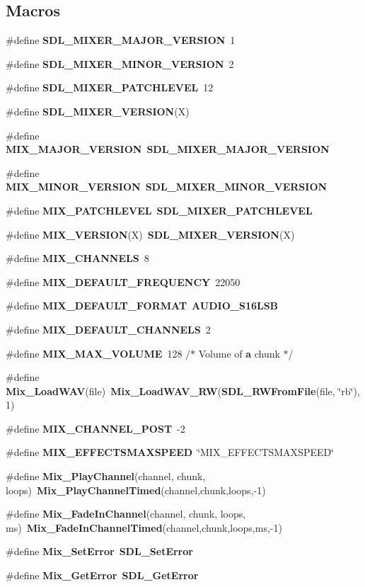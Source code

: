 \subsection*{Macros}
\begin{DoxyCompactItemize}
\item 
\#define {\bf S\+D\+L\+\_\+\+M\+I\+X\+E\+R\+\_\+\+M\+A\+J\+O\+R\+\_\+\+V\+E\+R\+S\+I\+O\+N}~1
\item 
\#define {\bf S\+D\+L\+\_\+\+M\+I\+X\+E\+R\+\_\+\+M\+I\+N\+O\+R\+\_\+\+V\+E\+R\+S\+I\+O\+N}~2
\item 
\#define {\bf S\+D\+L\+\_\+\+M\+I\+X\+E\+R\+\_\+\+P\+A\+T\+C\+H\+L\+E\+V\+E\+L}~12
\item 
\#define {\bf S\+D\+L\+\_\+\+M\+I\+X\+E\+R\+\_\+\+V\+E\+R\+S\+I\+O\+N}(X)
\item 
\#define {\bf M\+I\+X\+\_\+\+M\+A\+J\+O\+R\+\_\+\+V\+E\+R\+S\+I\+O\+N}~{\bf S\+D\+L\+\_\+\+M\+I\+X\+E\+R\+\_\+\+M\+A\+J\+O\+R\+\_\+\+V\+E\+R\+S\+I\+O\+N}
\item 
\#define {\bf M\+I\+X\+\_\+\+M\+I\+N\+O\+R\+\_\+\+V\+E\+R\+S\+I\+O\+N}~{\bf S\+D\+L\+\_\+\+M\+I\+X\+E\+R\+\_\+\+M\+I\+N\+O\+R\+\_\+\+V\+E\+R\+S\+I\+O\+N}
\item 
\#define {\bf M\+I\+X\+\_\+\+P\+A\+T\+C\+H\+L\+E\+V\+E\+L}~{\bf S\+D\+L\+\_\+\+M\+I\+X\+E\+R\+\_\+\+P\+A\+T\+C\+H\+L\+E\+V\+E\+L}
\item 
\#define {\bf M\+I\+X\+\_\+\+V\+E\+R\+S\+I\+O\+N}(X)~{\bf S\+D\+L\+\_\+\+M\+I\+X\+E\+R\+\_\+\+V\+E\+R\+S\+I\+O\+N}(X)
\item 
\#define {\bf M\+I\+X\+\_\+\+C\+H\+A\+N\+N\+E\+L\+S}~8
\item 
\#define {\bf M\+I\+X\+\_\+\+D\+E\+F\+A\+U\+L\+T\+\_\+\+F\+R\+E\+Q\+U\+E\+N\+C\+Y}~22050
\item 
\#define {\bf M\+I\+X\+\_\+\+D\+E\+F\+A\+U\+L\+T\+\_\+\+F\+O\+R\+M\+A\+T}~{\bf A\+U\+D\+I\+O\+\_\+\+S16\+L\+S\+B}
\item 
\#define {\bf M\+I\+X\+\_\+\+D\+E\+F\+A\+U\+L\+T\+\_\+\+C\+H\+A\+N\+N\+E\+L\+S}~2
\item 
\#define {\bf M\+I\+X\+\_\+\+M\+A\+X\+\_\+\+V\+O\+L\+U\+M\+E}~128	/$\ast$ Volume of {\bf a} chunk $\ast$/
\item 
\#define {\bf Mix\+\_\+\+Load\+W\+A\+V}(file)~{\bf Mix\+\_\+\+Load\+W\+A\+V\+\_\+\+R\+W}({\bf S\+D\+L\+\_\+\+R\+W\+From\+File}(file, \char`\"{}rb\char`\"{}), 1)
\item 
\#define {\bf M\+I\+X\+\_\+\+C\+H\+A\+N\+N\+E\+L\+\_\+\+P\+O\+S\+T}~-\/2
\item 
\#define {\bf M\+I\+X\+\_\+\+E\+F\+F\+E\+C\+T\+S\+M\+A\+X\+S\+P\+E\+E\+D}~\char`\"{}M\+I\+X\+\_\+\+E\+F\+F\+E\+C\+T\+S\+M\+A\+X\+S\+P\+E\+E\+D\char`\"{}
\item 
\#define {\bf Mix\+\_\+\+Play\+Channel}(channel,  chunk,  loops)~{\bf Mix\+\_\+\+Play\+Channel\+Timed}(channel,chunk,loops,-\/1)
\item 
\#define {\bf Mix\+\_\+\+Fade\+In\+Channel}(channel,  chunk,  loops,  ms)~{\bf Mix\+\_\+\+Fade\+In\+Channel\+Timed}(channel,chunk,loops,ms,-\/1)
\item 
\#define {\bf Mix\+\_\+\+Set\+Error}~{\bf S\+D\+L\+\_\+\+Set\+Error}
\item 
\#define {\bf Mix\+\_\+\+Get\+Error}~{\bf S\+D\+L\+\_\+\+Get\+Error}
\end{DoxyCompactItemize}
